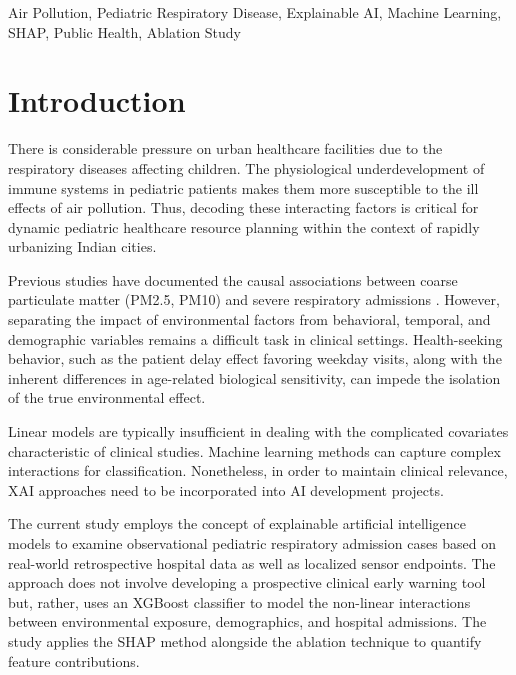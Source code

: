 \documentclass[conference]{IEEEtran}
\begin{document}
\begin{IEEEkeywords}
Air Pollution, Pediatric Respiratory Disease, Explainable AI, Machine Learning, SHAP, Public Health, Ablation Study
\end{IEEEkeywords}

\newpage %

\section{Introduction}
There is considerable pressure on urban healthcare facilities due to the respiratory diseases affecting children. The physiological underdevelopment of immune systems in pediatric patients makes them more susceptible to the ill effects of air pollution. Thus, decoding these interacting factors is critical for dynamic pediatric healthcare resource planning within the context of rapidly urbanizing Indian cities.

Previous studies have documented the causal associations between coarse particulate matter (PM2.5, PM10) and severe respiratory admissions \cite{who, pm25_pediatric}. However, separating the impact of environmental factors from behavioral, temporal, and demographic variables remains a difficult task in clinical settings. Health-seeking behavior, such as the patient delay effect favoring weekday visits, along with the inherent differences in age-related biological sensitivity, can impede the isolation of the true environmental effect.

Linear models are typically insufficient in dealing with the complicated covariates characteristic of clinical studies. Machine learning methods can capture complex interactions for classification. Nonetheless, in order to maintain clinical relevance, XAI approaches need to be incorporated into AI development projects.

The current study employs the concept of explainable artificial intelligence models to examine observational pediatric respiratory admission cases based on real-world retrospective hospital data as well as localized sensor endpoints. The approach does not involve developing a prospective clinical early warning tool but, rather, uses an XGBoost classifier to model the non-linear interactions between environmental exposure, demographics, and hospital admissions. The study applies the SHAP method alongside the ablation technique to quantify feature contributions.

\newpage %
\end{document}
